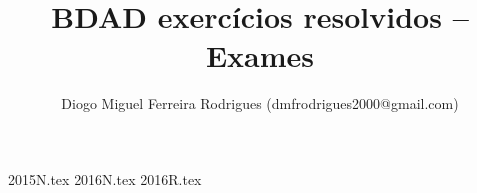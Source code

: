 \documentclass{bdad}
\title{BDAD exercícios resolvidos -- Exames}
\author{Diogo Miguel Ferreira Rodrigues (dmfrodrigues2000@gmail.com)}
\date{}
\begin{document}
\begingroup
\maketitle
    \let\clearpage\relax
	\tableofcontents
\endgroup
{2015N.tex}
{2016N.tex}
{2016R.tex}
\end{document}
